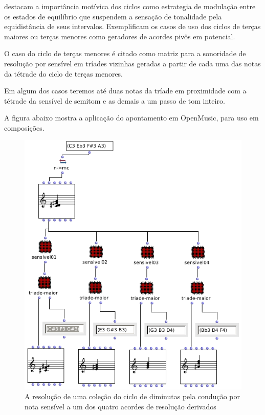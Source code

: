 \documentclass[
	12pt,				%
	openright,			%
	twoside,			%
	a4paper,			%
	english,			%
	french,				%
	spanish,			%
	brazil				%
	]{abntex2}
\begin{document}
 destacam a importância motívica dos ciclos como estrategia de modulação entre os estados de equilíbrio que suspendem a sensação de tonalidade pela equidistância de seus intervalos. Exemplificam os casos de uso dos ciclos de terças maiores ou terças menores como geradores de acordes pivôs em potencial.

O caso do ciclo de terças menores é citado como matriz para a sonoridade de resolução por sensível em tríades vizinhas geradas a partir de cada uma das notas da tétrade do ciclo de terças menores. 

Em algum dos casos teremos até duas notas da tríade em proximidade com a tétrade da sensível de semitom e as demais a um passo de tom inteiro. 

A figura abaixo mostra a aplicação do apontamento em OpenMusic, para uso em composições.
 

\begin{figure}[!h]
	\caption{\label{fig_grafico}A resolução de uma coleção do ciclo de diminutas pela condução por nota sensível a um dos quatro acordes de resolução derivados   }
	\begin{center}
	    \includegraphics[scale=0.6]{ciclos/sensivel.png}
	\end{center}
\end{figure}
\end{document}
